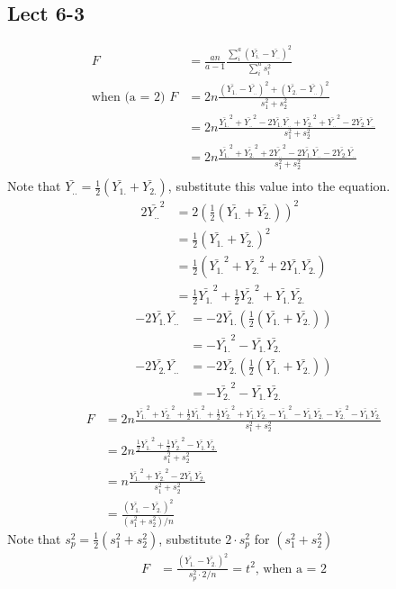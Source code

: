 \documentclass[11pt,letterpaper]{article}
\begin{document}
\subsection*{Lect 6-3}
\begin{align*}
F &= \frac{an}{a-1} \frac{\sum_i^a (\bar{Y_{i.}} - \bar{Y_{..}})^2}{\sum_i^a s_i^2} \\
\text{when (a = 2) } F &= 2n \frac{ (\bar{Y_{1.}} - \bar{Y_{..}})^2 + (\bar{Y_{2.}} - \bar{Y_{..}})^2}{s_1^2 + s_2^2} \\
&= 2n \frac{\bar{Y_{1.}}^2 + \bar{Y_{..}}^2 - 2 \bar{Y_{1.}}\bar{Y_{..}} + \bar{Y_{2.}}^2 + \bar{Y_{..}}^2 - 2 \bar{Y_{2.}}\bar{Y_{..}}     }{s_1^2 + s_2^2} \\
&= 2n \frac{\bar{Y_{1.}}^2 + \bar{Y_{2.}}^2 + 2 \bar{Y_{..}}^2 - 2 \bar{Y_{1.}}\bar{Y_{..}} - 2 \bar{Y_{2.}}\bar{Y_{..}}}{s_1^2 + s_2^2} \\
\end{align*}
Note that $\bar{Y_{..}} = \frac{1}{2} (\bar{Y_{1.}} + \bar{Y_{2.}})$, substitute this value into the equation.
\begin{align*}
2 \bar{Y_{..}}^2 &= 2 (\frac{1}{2} (\bar{Y_{1.}} + \bar{Y_{2.}}))^2 \\
&= \frac{1}{2} (\bar{Y_{1.}} + \bar{Y_{2.}})^2 \\
&= \frac{1}{2} (\bar{Y_{1.}}^2 + \bar{Y_{2.}}^2 + 2 \bar{Y_{1.}}\bar{Y_{2.}}) \\
&= \frac{1}{2} \bar{Y_{1.}}^2 + \frac{1}{2} \bar{Y_{2.}}^2 + \bar{Y_{1.}}\bar{Y_{2.}} 
\end{align*}
\begin{align*}
-2 \bar{Y_{1.}}\bar{Y_{..}} &= -2 \bar{Y_{1.}} (\frac{1}{2} (\bar{Y_{1.}} + \bar{Y_{2.}})) \\
&= - \bar{Y_{1.}} ^2 - \bar{Y_{1.}} \bar{Y_{2.}} 
\end{align*}
\begin{align*}
-2 \bar{Y_{2.}}\bar{Y_{..}} &= -2 \bar{Y_{2.}} (\frac{1}{2} (\bar{Y_{1.}} + \bar{Y_{2.}})) \\
&= - \bar{Y_{2.}} ^2 - \bar{Y_{1.}} \bar{Y_{2.}} 
\end{align*}
\begin{align*}
F &= 2n \frac{\bar{Y_{1.}}^2 + \bar{Y_{2.}}^2 + \frac{1}{2} \bar{Y_{1.}}^2 + \frac{1}{2} \bar{Y_{2.}}^2 + \bar{Y_{1.}}\bar{Y_{2.}} - \bar{Y_{1.}} ^2 - \bar{Y_{1.}} \bar{Y_{2.}}  - \bar{Y_{2.}} ^2 - \bar{Y_{1.}} \bar{Y_{2.}} }{s_1^2 + s_2^2} \\
&= 2n \frac{\frac{1}{2} \bar{Y_{1.}}^2 + \frac{1}{2	} \bar{Y_{2.}}^2 -  \bar{Y_{1.}} \bar{Y_{2.}} }{s_1^2 + s_2^2} \\
&= n \frac{\bar{Y_{1.}}^2 + \bar{Y_{2.}}^2 -  2\bar{Y_{1.}} \bar{Y_{2.}} }{s_1^2 + s_2^2} \\
&= \frac{(\bar{Y_{1.}} - \bar{Y_{2.}})^2}{(s_1^2 + s_2^2) / n}
\end{align*}
Note that $s_p^2 = \frac{1}{2}(s_1^2 + s_2^2)$, substitute $2 \cdot s_p^2$ for $(s_1^2 + s_2^2)$
\begin{align*}
F &=  \frac{(\bar{Y_{1.}} - \bar{Y_{2.}})^2}{s_p^2 \cdot  2/n} = t^2 \text{, when a = 2}
\end{align*}
\end{document}
